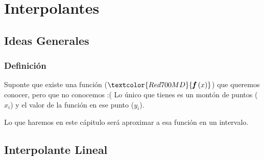 \documentclass[12pt, fleqn]{report}                             %
\theoremstyle{break}                                            %
\newcommand{\Wrap}[1]           {\left( #1 \right)}             %
\newcommand{\Color}[2]{\textcolor{#1}{#2}}                      %
\newcommand \ColorFun          {Red700MD}                       %
\newcommand \Fun[1]      {\Color{\ColorFun}{\pmb{f}\Wrap{#1}}}          %
\begin{document}
            





\part{Interpolantes}
\clearpage


    \chapter{Ideas Generales}

        \clearpage
        \section{Definición}

            Suponte que existe una función ($\Fun{x}$) que queremos conocer, pero que no conocemos :(
            Lo único que tienes es un montón de puntos ($x_i$) y  el valor de la función en ese punto ($y_i$).

            Lo que haremos en este cápitulo será aproximar a esa función en un intervalo.


    \chapter{Interpolante Lineal}

\end{document}
